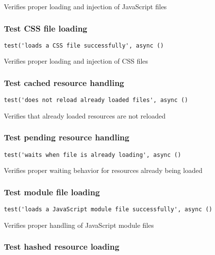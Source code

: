 \documentclass[a4paper]{article}
\begin{document}
Verifies proper loading and injection of JavaScript files

\hypertarget{toc525}{}
\subsubsection{Test CSS file loading}

\begin{lstlisting}
test('loads a CSS file successfully', async ()
\end{lstlisting}

Verifies proper loading and injection of CSS files

\hypertarget{toc526}{}
\subsubsection{Test cached resource handling}

\begin{lstlisting}
test('does not reload already loaded files', async ()
\end{lstlisting}

Verifies that already loaded resources are not reloaded

\hypertarget{toc527}{}
\subsubsection{Test pending resource handling}

\begin{lstlisting}
test('waits when file is already loading', async ()
\end{lstlisting}

Verifies proper waiting behavior for resources already being loaded

\hypertarget{toc528}{}
\subsubsection{Test module file loading}

\begin{lstlisting}
test('loads a JavaScript module file successfully', async ()
\end{lstlisting}

Verifies proper handling of JavaScript module files

\hypertarget{toc529}{}
\subsubsection{Test hashed resource loading}
\end{document}
